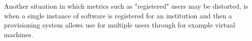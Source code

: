 Another situation in which metrics such as "registered" users may be distorted, is when a single instance of software is registered for an institution and then a provisioning system allows use for multiple users through for example virtual machines. 